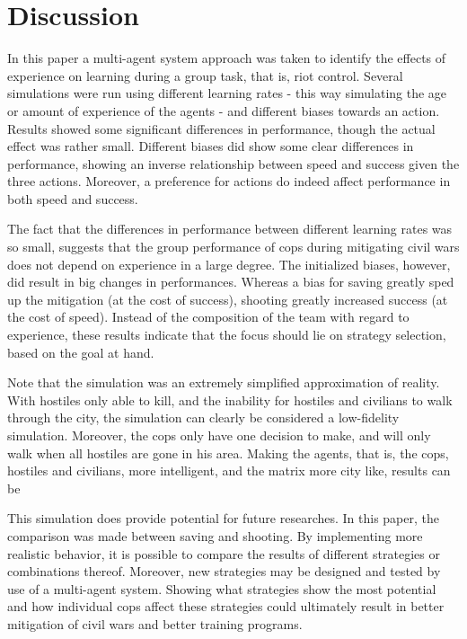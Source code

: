 \section{Discussion}
In this paper a multi-agent system approach was taken to identify the effects of experience on learning during a group task, that is, riot control. Several simulations were run using different learning rates - this way simulating the age or amount of experience of the agents - and different biases towards an action. Results showed some significant differences in performance, though the actual effect was rather small. Different biases did show some clear differences in performance, showing an inverse relationship between speed and success given the three actions. Moreover, a preference for actions do indeed affect performance in both speed and success. 

The fact that the differences in performance between different learning rates was so small, suggests that the group performance of cops during mitigating civil wars does not depend on experience in a large degree. The initialized biases, however, did result in big changes in performances. Whereas a bias for saving greatly sped up the mitigation (at the cost of success), shooting greatly increased success (at the cost of speed). Instead of the composition of the team with regard to experience, these results indicate that the focus should lie on strategy selection, based on the goal at hand. 

Note that the simulation was an extremely simplified approximation of reality. With hostiles only able to kill, and the inability for hostiles and civilians to walk through the city, the simulation can clearly be considered a low-fidelity simulation. Moreover, the cops only have one decision to make, and will only walk when all hostiles are gone in his area. Making the agents, that is, the cops, hostiles and civilians, more intelligent, and the matrix more city like, results can be 

This simulation does provide potential for future researches. In this paper, the comparison was made between saving and shooting. By implementing more realistic behavior, it is possible to compare the results of different strategies or combinations thereof. Moreover, new strategies may be designed and tested by use of a multi-agent system. Showing what strategies show the most potential and how individual cops affect these strategies could ultimately result in better mitigation of civil wars and better training programs. 

